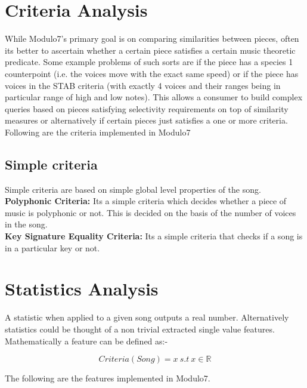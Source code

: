 \section{Criteria Analysis} \label{criteria}

\noindent While Modulo7's primary goal is on comparing similarities between pieces, often its better to ascertain whether a certain piece satisfies a certain music theoretic predicate. Some example problems of such sorts are if the piece has a species 1 counterpoint (i.e. the voices move with the exact same speed) or if the piece has voices in the STAB criteria (with exactly 4 voices and their ranges being in particular range of high and low notes). This allows a consumer to build complex queries based on pieces satisfying selectivity requirements on top of similarity measures or alternatively if certain pieces just satisfies a one or more criteria. Following are the criteria implemented in Modulo7

\subsection{Simple criteria} 

\noindent Simple criteria are based on simple global level properties of the song. \\

\noindent \textbf{Polyphonic Criteria:} Its a simple criteria which decides whether a piece of music is polyphonic or not. This is decided on the basis of the number of voices in the song. \\

\noindent \textbf{Key Signature Equality Criteria:} Its a simple criteria that checks if a song is in a particular key or not.

\section{Statistics Analysis} \label{statistic}

\noindent A statistic when applied to a given song outputs a real number. Alternatively statistics could be thought of a non trivial extracted single value features. Mathematically a feature can be defined as:-

\begin{equation}
Criteria(Song) = x \ s.t \ x \in \mathbb{R}
\end{equation}

\noindent The following are the features implemented in Modulo7.  \\

